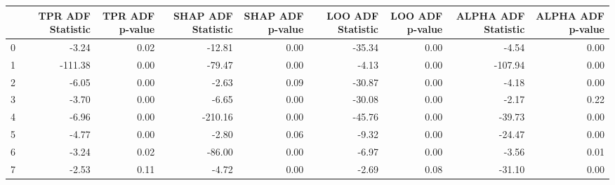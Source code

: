 \begin{tabular}{lrrrrrrrr}
\toprule
 & TPR ADF Statistic & TPR ADF p-value & SHAP ADF Statistic & SHAP ADF p-value & LOO ADF Statistic & LOO ADF p-value & ALPHA ADF Statistic & ALPHA ADF p-value \\
\midrule
0 & -3.24 & 0.02 & -12.81 & 0.00 & -35.34 & 0.00 & -4.54 & 0.00 \\
1 & -111.38 & 0.00 & -79.47 & 0.00 & -4.13 & 0.00 & -107.94 & 0.00 \\
2 & -6.05 & 0.00 & -2.63 & 0.09 & -30.87 & 0.00 & -4.18 & 0.00 \\
3 & -3.70 & 0.00 & -6.65 & 0.00 & -30.08 & 0.00 & -2.17 & 0.22 \\
4 & -6.96 & 0.00 & -210.16 & 0.00 & -45.76 & 0.00 & -39.73 & 0.00 \\
5 & -4.77 & 0.00 & -2.80 & 0.06 & -9.32 & 0.00 & -24.47 & 0.00 \\
6 & -3.24 & 0.02 & -86.00 & 0.00 & -6.97 & 0.00 & -3.56 & 0.01 \\
7 & -2.53 & 0.11 & -4.72 & 0.00 & -2.69 & 0.08 & -31.10 & 0.00 \\
\bottomrule
\end{tabular}
